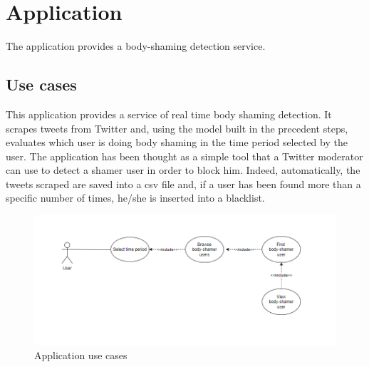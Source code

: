 \section{Application}

The application provides a body-shaming detection service. 

\subsection{Use cases}

This application provides a service of real time body shaming detection. It scrapes tweets from Twitter and, using the model built in the precedent steps, evaluates which user is doing body shaming in the time period selected by the user. 
The application has been thought as a simple tool that a Twitter moderator can use to detect a shamer user in order to block him. Indeed, automatically,  the tweets scraped are saved into a csv file and, if a user has been found more than a specific number of times, he/she is inserted into a blacklist. 

\begin{figure}[H]
    \centering
    \includegraphics[width= 1.05\textwidth]{images/application/usecases.PNG}
    \caption{Application use cases} 
    \label{application-use-cases}
\end{figure}

